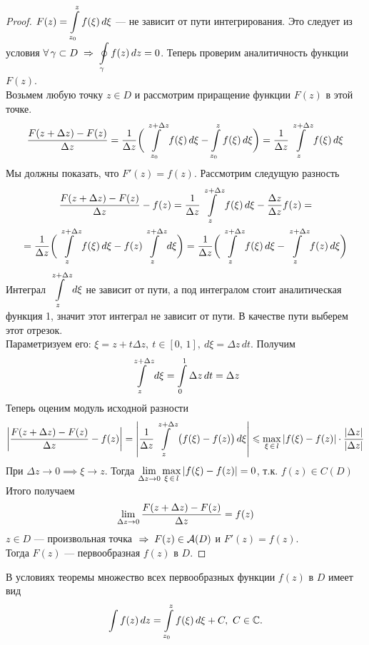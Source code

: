 	\begin{proof}
		$F(z) = \displaystyle\int\limits_{z_0}^z f(\xi)\,d\xi$ --- не зависит от пути интегрирования. Это следует из условия $\forall\,\gamma\subset D\;\Rightarrow\;\displaystyle\oint\limits_\gamma f(z)\,dz = 0$.
		Теперь проверим аналитичность функции $F(z)$.\\
		Возьмем любую точку $z \in D$ и рассмотрим приращение функции $F(z)$ в этой точке.
		\[ \frac{F(z+\Delta z) - F(z)}{\Delta z} = \frac{1}{\Delta z}\bigg( \int\limits_{z_0}^{z+\Delta z} f(\xi)\,d\xi - \int\limits_{z_0}^z f(\xi)\,d\xi \bigg) = \frac{1}{\Delta z}\int\limits_z^{z + \Delta z} f(\xi)\,d\xi \]
		Мы должны показать, что $F'(z) = f(z)$. Рассмотрим следущую разность
		\begin{multline*}
			\frac{F(z + \Delta z) - F(z)}{\Delta z} - f(z) 
			= \frac{1}{\Delta z}\int\limits_z^{z+\Delta z} f(\xi)\,d\xi - \frac{\Delta z}{\Delta z}f(z)=\\
			= \frac{1}{\Delta z} \bigg(\int\limits_z^{z+ \Delta z}f(\xi)\,d\xi - f(z)\int\limits_z^{z+\Delta z}d\xi\bigg) = \frac{1}{\Delta z} \bigg(\int\limits_z^{z+ \Delta z}f(\xi)\,d\xi - \int\limits_z^{z+\Delta z}f(z)\,d\xi\bigg)
		\end{multline*}
		Интеграл $\displaystyle\int\limits_z^{z+\Delta z}d\xi$ не зависит от пути, а под интегралом стоит аналитическая функция 1, значит этот интеграл не зависит от пути. В качестве пути выберем этот отрезок.\\ Параметризуем его: $\xi = z + t \Delta z,\ t\in[0,\,1],\ d\xi = \Delta z\,dt$. Получим
		\[ \int\limits_z^{z+\Delta z}d\xi = \int\limits_0^1\Delta z\,dt = \Delta z \]
		Теперь оценим модуль исходной разности
		\[ \left|\frac{F(z+\Delta z)-F(z)}{\Delta z} - f(z)\right| = \left| \frac{1}{\Delta z}\int\limits_z^{z + \Delta z}\big(f(\xi)-f(z)\big)\,d\xi\right|
	    \leqslant\max_{\xi\,\in\,l}|f(\xi)-f(z)|\cdot\frac{|\Delta z|}{|\Delta z|} \]
		При $\Delta z \to 0 \implies \xi \to z$. Тогда $\lim\limits_{\Delta z\to 0} \max\limits_{\xi\,\in\,l}|f(\xi) - f(z)| = 0$, т.к. $f(z) \in C(D)$\\
		Итого получаем
		\[ \lim\limits_{\Delta z \to 0} \frac{F(z + \Delta z) - F(z)}{\Delta z} = f(z) \]
		$z \in D$ --- произвольная точка $\;\Rightarrow\; F(z)\in\mathcal{A}(D)$ и $F'(z) = f(z)$.\\ Тогда $F(z)$ --- первообразная $f(z)$ в $D$.
	\end{proof}
	\newpage
	\begin{consequence}
		В условиях теоремы множество всех первообразных функции $f(z)$ в $D$ имеет вид
		\[ \int f(z)\,dz = \int\limits_{z_0}^z f(\xi)\,d\xi + C,\ C\in \mathbb{C}. \]
	\end{consequence}
